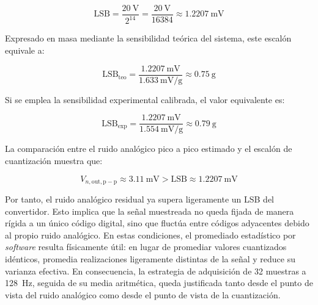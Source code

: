 \[
    \mathrm{LSB} = \frac{\SI{20}{\V}}{2^{14}}
    = \frac{\SI{20}{\V}}{16384}
    \approx \SI{1.2207}{\milli\V}
\]

Expresado en masa mediante la sensibilidad teórica del sistema, este escalón equivale a:

\[
    \mathrm{LSB}_{\mathrm{teo}} = \frac{\SI{1.2207}{\milli\V}}{\SI{1.633}{\milli\V\per\g}}
    \approx \SI{0.75}{\g}
\]

Si se emplea la sensibilidad experimental calibrada, el valor equivalente es:

\[
    \mathrm{LSB}_{\mathrm{exp}} = \frac{\SI{1.2207}{\milli\V}}{\SI{1.554}{\milli\V\per\g}}
    \approx \SI{0.79}{\g}
\]

La comparación entre el ruido analógico pico a pico estimado y el escalón de cuantización muestra que:

\[
    V_{n,\mathrm{out,p-p}} \approx \SI{3.11}{\milli\V} > \mathrm{LSB} \approx \SI{1.2207}{\milli\V}
\]

Por tanto, el ruido analógico residual ya supera ligeramente un LSB del convertidor. Esto implica que la señal muestreada no queda fijada de manera rígida a un único código digital, sino que fluctúa entre códigos adyacentes debido al propio ruido analógico. En estas condiciones, el promediado estadístico por \textit{software} resulta físicamente útil: en lugar de promediar valores cuantizados idénticos, promedia realizaciones ligeramente distintas de la señal y reduce su varianza efectiva. En consecuencia, la estrategia de adquisición de 32 muestras a \SI{128}{\Hz}, seguida de su media aritmética, queda justificada tanto desde el punto de vista del ruido analógico como desde el punto de vista de la cuantización.
